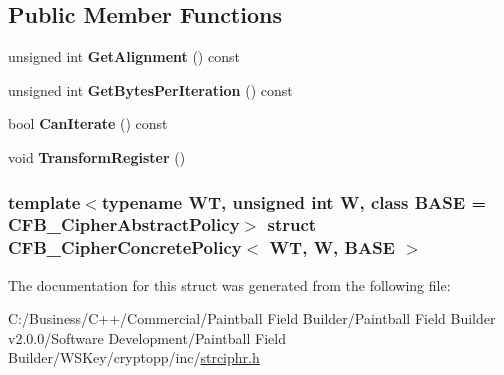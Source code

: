 \subsection*{Public Member Functions}
\begin{DoxyCompactItemize}
\item 
\hypertarget{struct_c_f_b___cipher_concrete_policy_aaa2a883d45a2209fdb5d606c238ebb40}{
unsigned int {\bfseries GetAlignment} () const }
\label{struct_c_f_b___cipher_concrete_policy_aaa2a883d45a2209fdb5d606c238ebb40}

\item 
\hypertarget{struct_c_f_b___cipher_concrete_policy_ab78dc775ca46f7a8202a35281ccbbb8b}{
unsigned int {\bfseries GetBytesPerIteration} () const }
\label{struct_c_f_b___cipher_concrete_policy_ab78dc775ca46f7a8202a35281ccbbb8b}

\item 
\hypertarget{struct_c_f_b___cipher_concrete_policy_a751ddb08474e90f6c6fea58d6dc08e5c}{
bool {\bfseries CanIterate} () const }
\label{struct_c_f_b___cipher_concrete_policy_a751ddb08474e90f6c6fea58d6dc08e5c}

\item 
\hypertarget{struct_c_f_b___cipher_concrete_policy_a620b544b8ec71768e9872315c82ed206}{
void {\bfseries TransformRegister} ()}
\label{struct_c_f_b___cipher_concrete_policy_a620b544b8ec71768e9872315c82ed206}

\end{DoxyCompactItemize}
\subsubsection*{template$<$typename WT, unsigned int W, class BASE = CFB\_\-CipherAbstractPolicy$>$ struct CFB\_\-CipherConcretePolicy$<$ WT, W, BASE $>$}



The documentation for this struct was generated from the following file:\begin{DoxyCompactItemize}
\item 
C:/Business/C++/Commercial/Paintball Field Builder/Paintball Field Builder v2.0.0/Software Development/Paintball Field Builder/WSKey/cryptopp/inc/\hyperlink{strciphr_8h}{strciphr.h}\end{DoxyCompactItemize}
